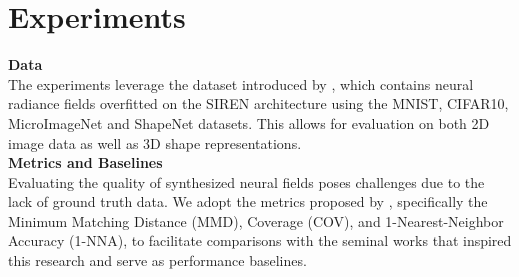 \section{Experiments}
\label{sec:exper}
\textbf{Data}\\
The experiments leverage the dataset introduced by \cite{papa2023train}, which contains neural radiance fields overfitted on the SIREN architecture using the MNIST, CIFAR10, MicroImageNet and ShapeNet datasets. This allows for evaluation on both 2D image data as well as 3D shape representations. \\
\textbf{Metrics and Baselines}\\
Evaluating the quality of synthesized neural fields poses challenges due to the lack of ground truth data. We adopt the metrics proposed by \cite{erkoç2023hyperdiffusion}, specifically the Minimum Matching Distance (MMD), Coverage (COV), and 1-Nearest-Neighbor Accuracy (1-NNA), to facilitate comparisons with the seminal works that inspired this research and serve as performance baselines. \\